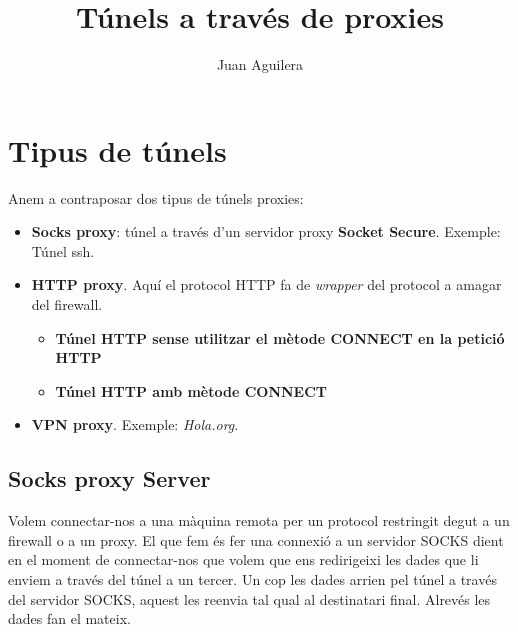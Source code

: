 \documentclass[a4paper]{article}
\begin{document}
\title{Túnels a trav\'es de proxies}
\author{Juan Aguilera}
\maketitle


\section{Tipus de túnels}

Anem a contraposar dos tipus de túnels proxies: 
\begin{itemize}
	\item \textbf{Socks proxy}: túnel a trav\'es d'un servidor proxy \textbf{Socket Secure}. Exemple: Túnel ssh. 
	\item \textbf{HTTP proxy}. Aquí el protocol HTTP fa de \textit{wrapper} del protocol a amagar del firewall.
		\begin{itemize}
			\item \textbf{Túnel HTTP sense utilitzar el mètode CONNECT en la petició HTTP}
			\item \textbf{Túnel HTTP amb mètode CONNECT}
		\end{itemize}
	\item \textbf{VPN proxy}. Exemple: \textit{Hola.org}.
\end{itemize}

\subsection{Socks proxy Server}

Volem connectar-nos a una màquina remota per un protocol restringit degut a un firewall o a un proxy. El que fem \'es fer una connexió a un servidor SOCKS dient en el moment de connectar-nos que volem que ens redirigeixi les dades que li enviem a trav\'es del túnel a un tercer. Un cop les dades arrien pel túnel a trav\'es del servidor SOCKS, aquest les reenvia tal qual al destinatari final. Alrev\'es les dades fan el mateix.
\end{document}
